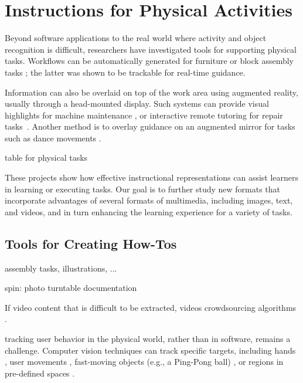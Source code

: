 
\section{Instructions for Physical Activities}
\label{related_physical}

Beyond software applications to the real world where activity and object recognition is difficult, researchers have investigated tools for supporting physical tasks. Workflows can be automatically generated for furniture \cite{agrawala2003designing} or block assembly tasks \cite{Gupta:2012ku}; the latter was shown to be trackable for real-time guidance.

Information can also be overlaid on top of the work area using augmented reality, usually through a head-mounted display. Such systems can provide visual highlights for machine maintenance \cite{Henderson:2011ff}, or interactive remote tutoring for repair tasks~\cite{Gurevich:2012ko}. Another method is to overlay guidance on an augmented mirror for tasks such as dance movements \cite{Anderson:2013:YEM:2501988.2502045}.

table for physical tasks \cite{Knibbe:2015:SMI:2817721.2817741}

These projects show how effective instructional representations can assist learners in learning or executing tasks. Our goal is to further study new formats that incorporate advantages of several formats of multimedia, including images, text, and videos, and in turn enhancing the learning experience for a variety of tasks.


\subsection{Tools for Creating How-Tos}

assembly tasks, illustrations, ...

spin: photo turntable \cite{Tseng:2015:SPT:2771839.2771869}
documentation \cite{Tseng:2016:makeology}

If video content that is difficult to be extracted, videos crowdsourcing algorithms \cite{Kim:2014:CSI:2611222.2556986}.

tracking user behavior in the physical world, rather than in software, remains a challenge. Computer vision techniques can track specific targets, including hands \cite{Ranjan:2008}, user movements \cite{Wilson:2012fb}, fast-moving objects (e.g., a Ping-Pong ball) \cite{Okumura:2011tr}, or regions in pre-defined spaces \cite{Ranjan:2007}.

